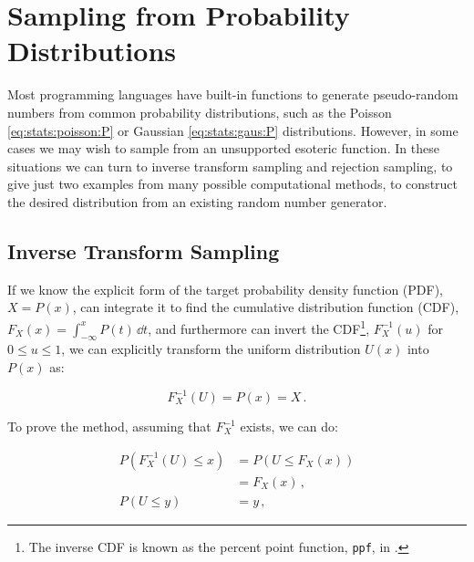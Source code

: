 \section{Sampling from Probability Distributions}
\label{misc:sampling_prob_dist}

Most programming languages have built-in functions to generate
pseudo-random numbers from common probability distributions,
such as the Poisson \cref{eq:stats:poisson:P} or Gaussian \cref{eq:stats:gaus:P} distributions.
However, in some cases we may wish to sample from an unsupported esoteric function.
In these situations we can turn to inverse transform sampling and rejection sampling,
to give just two examples from many possible computational methods,
to construct the desired distribution from an existing random number generator.

\subsection{Inverse Transform Sampling}
\label{misc:sampling_prob_dist:inverse}

If we know the explicit form of the target probability density function (PDF), $X = P\left(x\right)$,
can integrate it to find the cumulative distribution function (CDF), $F_{X}\left(x\right) = \int_{-\infty}^{x} P\left(t\right) \, \dd{t}$,
and furthermore can invert the CDF\footnote{The inverse CDF
is known as the percent point function, \texttt{ppf},
in \href{https://docs.scipy.org/doc/scipy-0.14.0/reference/stats.html}{\scipy}.}, $F^{-1}_{X}\left(u\right)$ for $0 \leq u \leq 1$,
we can explicitly transform the uniform distribution $U\left(x\right)$ into $P\left(x\right)$ as:

\begin{equation}\label{eq:stats:sampling_prob_dist:inverse}
F^{-1}_{X}\left(U\right) = P\left(x\right) = X\,.
\end{equation}

To prove the method, assuming that $F^{-1}_{X}$ exists, we can do:

\begin{subequations}\label{eq:stats:sampling_prob_dist:inverse_proof}
\begin{align}
P\left(F^{-1}_{X}\left(U\right) \leq x\right) &= P\left(U \leq F_{X}\left(x\right) \right) \label{eq:stats:sampling_prob_dist:inverse_proof:inverse} \\
&= F_{X}\left(x\right)\,,\label{eq:stats:sampling_prob_dist:inverse_proof:def} \\
P\left(U \leq y\right) &= y\,, \label{eq:stats:sampling_prob_dist:inverse_proof:U}
\end{align}
\end{subequations}

